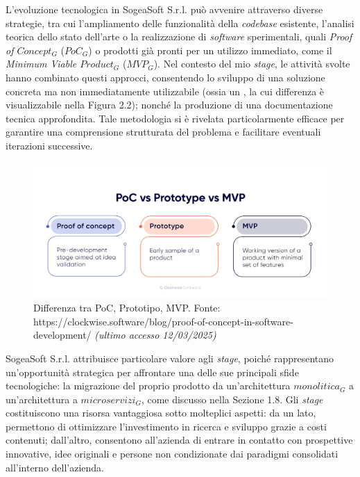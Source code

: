     \vspace{0.2 em}
    \noindent L'evoluzione tecnologica in SogeaSoft S.r.l. può avvenire attraverso diverse strategie, tra cui l’ampliamento delle funzionalità della \textit{codebase} esistente, l’analisi teorica dello stato dell’arte o la realizzazione di \textit{software} sperimentali, quali \textit{Proof of $Concept_G$} ($PoC_G$) o prodotti già pronti per un utilizzo immediato, come il \textit{Minimum Viable $Product_G$} ($MVP_G$). Nel contesto del mio \textit{stage}, le attività svolte hanno combinato questi approcci, consentendo lo sviluppo di una soluzione concreta ma non immediatamente utilizzabile (ossia un , la cui differenza è visualizzabile nella Figura 2.2); nonché la produzione di una documentazione tecnica approfondita. Tale metodologia si è rivelata particolarmente efficace per garantire una comprensione strutturata del problema e facilitare eventuali iterazioni successive.  
    \begin{figure}[H]
        \centering
        \includegraphics[width=0.5\linewidth]{BCS-Tessi/images/PoC_MVP.jpeg}
        \caption[Differenza tra PoC, Prototipo, MVP]{Differenza tra PoC, Prototipo, MVP. Fonte: https://clockwise.software/blog/proof-of-concept-in-software-development/ \textit{(ultimo accesso 12/03/2025)}}
        \label{fig:PoC-prototipo-MVP}
    \end{figure}

    \vspace{0.2 em}
    \noindent SogeaSoft S.r.l. attribuisce particolare valore agli \textit{stage}, poiché rappresentano un'opportunità strategica per affrontare una delle sue principali sfide tecnologiche: la migrazione del proprio prodotto da un’architettura $monolitica_G$ a un’architettura a $microservizi_G$, come discusso nella Sezione 1.8. Gli \textit{stage} costituiscono una risorsa vantaggiosa sotto molteplici aspetti: da un lato, permettono di ottimizzare l’investimento in ricerca e sviluppo grazie a costi contenuti; dall’altro, consentono all’azienda di entrare in contatto con prospettive innovative, idee originali e persone non condizionate dai paradigmi consolidati all'interno dell’azienda.  

